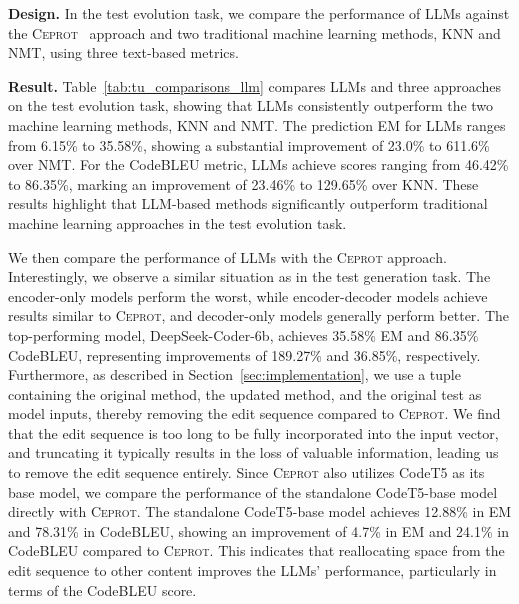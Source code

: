 \textbf{Design.}
In the test evolution task, we compare the performance of LLMs against the \textsc{Ceprot}~\cite{hu_identify_2023} approach and two traditional machine learning methods, KNN and NMT, using three text-based metrics.

\textbf{Result.}
Table~\ref{tab:tu_comparisons_llm} compares LLMs and three approaches on the test evolution task, showing that LLMs consistently outperform the two machine learning methods, KNN and NMT. 
The prediction EM for LLMs ranges from 6.15\% to 35.58\%, showing a substantial improvement of 23.0\% to 611.6\% over NMT. 
For the CodeBLEU metric, LLMs achieve scores ranging from 46.42\% to 86.35\%, marking an improvement of 23.46\% to 129.65\% over KNN. These results highlight that LLM-based methods significantly outperform traditional machine learning approaches in the test evolution task.



We then compare the performance of LLMs with the \textsc{Ceprot} approach. Interestingly, we observe a similar situation as in the test generation task. 
The encoder-only models perform the worst, while encoder-decoder models achieve results similar to \textsc{Ceprot}, and decoder-only models generally perform better. 
The top-performing model, DeepSeek-Coder-6b, achieves 35.58\% EM and 86.35\% CodeBLEU, representing improvements of 189.27\% and 36.85\%, respectively. 
Furthermore, as described in Section~\ref{sec:implementation}, we use a tuple containing the original method, the updated method, and the original test as model inputs, thereby removing the edit sequence compared to \textsc{Ceprot}. 
We find that the edit sequence is too long to be fully incorporated into the input vector, and truncating it typically results in the loss of valuable information, leading us to remove the edit sequence entirely.
Since \textsc{Ceprot} also utilizes CodeT5 as its base model, we compare the performance of the standalone CodeT5-base model directly with \textsc{Ceprot}.
The standalone CodeT5-base model achieves 12.88\% in EM and 78.31\% in CodeBLEU, showing an improvement of 4.7\% in EM and 24.1\% in CodeBLEU compared to \textsc{Ceprot}. This indicates that reallocating space from the edit sequence to other content improves the LLMs’ performance, particularly in terms of the CodeBLEU score.





